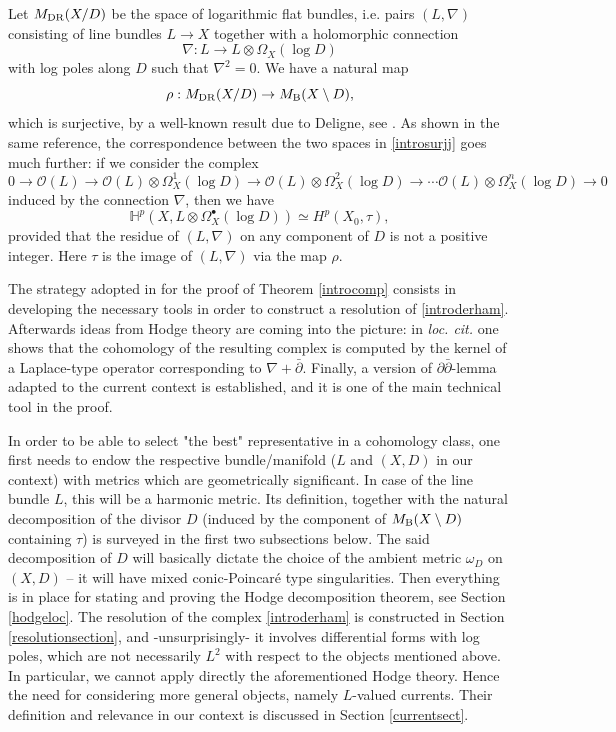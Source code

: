 \documentclass[english]{amsart}
\newcommand{\ddbar}{\partial\bar{\partial}}
\newcommand{\dbar}{\bar \partial}
\numberwithin{equation}{thm}
\begin{document}
Let $M_{\rm DR}(X/D)$ be the space of logarithmic flat bundles, i.e. pairs $(L, \nabla)$ consisting of line bundles $L\to X$ together with a holomorphic connection   
\[\nabla: L\to L\otimes \Omega_X(\log D)\]
with log poles along $D$ such that $\nabla^2= 0$. We have a natural map
\begin{equation}\label{introsurjj}
\rho: M_{\rm DR}(X/D)\to M_{\rm B}(X\setminus D),
\end{equation}
which is surjective, by a well-known result due to Deligne, see \cite[II, 6.10]{Del70}. As shown in the same reference, the correspondence between the 
two spaces in \eqref{introsurjj} goes much further: if we consider the complex 
\begin{equation}\label{introderham}
	0 \to \mathcal{O} (L) \to\mathcal{O} (L) \otimes \Omega_X^{1}(\log D) \to  \mathcal{O} (L) \otimes \Omega_X^{2}(\log D) \to \cdots \mathcal{O} (L) \otimes \Omega_X^{n}(\log D) \to 0 
	\end{equation}
induced by the connection $\nabla$, then we have $$\mathbb H^p (X, L \otimes \Omega_X ^{\bullet }(\log D) )\simeq H^p (X_0, \tau),$$
provided that the residue of $(L, \nabla)$ on any component of $D$ is not a positive integer. Here $\tau$ is the image of $(L, \nabla)$ via the map $\rho$. 
\smallskip

The strategy adopted in \cite{CDHP} for the proof of Theorem \ref{introcomp} consists in developing the necessary tools in order to construct a resolution of  \eqref{introderham}. Afterwards ideas from Hodge theory are coming into the picture: in \emph{loc. cit.} one shows that the cohomology of the resulting complex is computed by the kernel of a Laplace-type operator corresponding to $\nabla + \dbar$. Finally, a version of $\ddbar$-lemma adapted to the current context is established, and it is one of the main technical tool in the proof.

In order to be able to select "the best" representative in a cohomology class, one first needs to endow the respective bundle/manifold ($L$ and $(X, D)$ in our context) with metrics which are 
geometrically significant. In case of the line bundle $L$, this will be a harmonic metric. Its definition, together with the natural decomposition of the divisor $D$ (induced by the component of $M_{\rm B}(X\setminus D)$ containing $\tau$) is surveyed in the first two subsections below. The said decomposition of $D$ will basically dictate the choice of the ambient metric $\omega_D$ on $(X, D)$ -- it will have mixed 
conic-Poincaré type singularities. Then everything is in place for stating and proving the Hodge decomposition theorem, see Section \ref{hodgeloc}. The resolution of the complex \eqref{introderham} is constructed in Section \ref{resolutionsection}, and -unsurprisingly- it involves differential forms with log poles, which are not necessarily $L^2$ with respect to the objects mentioned above. In particular, we cannot apply directly the aforementioned Hodge theory.
Hence the need for considering more general objects, namely $L$-valued currents. Their definition and relevance in our context is discussed in Section \ref{currentsect}. 
\end{document}
